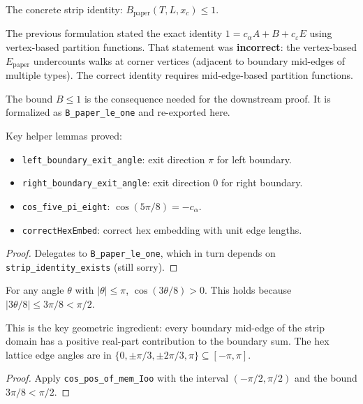 \begin{theorem}\label{thm:strip_identity_concrete}
\leanok
{}
  The concrete strip identity: $B_{\text{paper}}(T,L,x_c) \le 1$.

  The previous formulation stated the exact identity
  $1 = c_\alpha A + B + c_\varepsilon E$ using vertex-based partition
  functions. That statement was \textbf{incorrect}: the vertex-based
  $E_{\text{paper}}$ undercounts walks at corner vertices (adjacent to
  boundary mid-edges of multiple types). The correct identity requires
  mid-edge-based partition functions.

  The bound $B \le 1$ is the consequence needed for the downstream proof.
  It is formalized as \texttt{B\_paper\_le\_one} and re-exported here.

  Key helper lemmas proved:
  \begin{itemize}
  \item \texttt{left\_boundary\_exit\_angle}: exit direction $\pi$ for left boundary.
  \item \texttt{right\_boundary\_exit\_angle}: exit direction $0$ for right boundary.
  \item \texttt{cos\_five\_pi\_eight}: $\cos(5\pi/8) = -c_\alpha$.
  \item \texttt{correctHexEmbed}: correct hex embedding with unit edge lengths.
  \end{itemize}
\end{theorem}
\begin{proof}
  Delegates to \texttt{B\_paper\_le\_one}, which in turn depends on
  \texttt{strip\_identity\_exists} (still sorry).
\end{proof}

\begin{lemma}\label{lem:boundary_cos_pos}
\leanok
  For any angle $\theta$ with $|\theta| \le \pi$,
  $\cos(3\theta/8) > 0$.
  This holds because $|3\theta/8| \le 3\pi/8 < \pi/2$.

  This is the key geometric ingredient: every boundary mid-edge
  of the strip domain has a positive real-part contribution to the
  boundary sum. The hex lattice edge angles are in
  $\{0, \pm\pi/3, \pm 2\pi/3, \pi\} \subseteq [-\pi, \pi]$.
\end{lemma}
\begin{proof}
\leanok
  Apply \texttt{cos\_pos\_of\_mem\_Ioo} with the interval $(-\pi/2, \pi/2)$
  and the bound $3\pi/8 < \pi/2$.
\end{proof}

